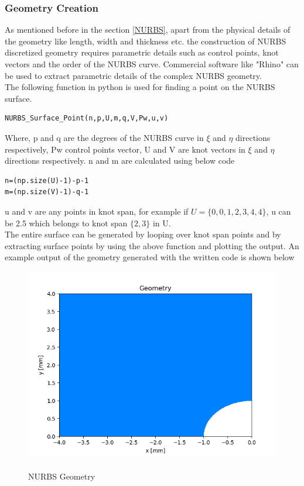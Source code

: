 \documentclass[11pt]{article}
\begin{document}
\subsubsection{Geometry Creation} \label{GeometryCreation}
As mentioned before in the section \ref{NURBS}, apart from the physical details of the geometry like length, width and thickness etc. the construction of NURBS discretized geometry requires parametric details such as control points, knot vectors and the order of the NURBS curve. Commercial software like "Rhino" can be used to extract parametric details of the complex NURBS geometry. \\ The following function in python is used for finding a point on the NURBS surface.
\begin{verbatim}
NURBS_Surface_Point(n,p,U,m,q,V,Pw,u,v)
\end{verbatim}
Where, p and q are the degrees of the NURBS curve in $\xi$ and $\eta$ directions respectively, Pw control points vector, U and V are knot vectors in $\xi$ and $\eta$ directions respectively. 
n and m are calculated using below code
\begin{verbatim}
n=(np.size(U)-1)-p-1
m=(np.size(V)-1)-q-1 
\end{verbatim}
u and v are any points in knot span, for example if 
$U = \{0,0,1,2,3,4,4\}$,
u can be 2.5 which belongs to knot span $\{2,3\}$ in U.\\
The entire surface can be generated by looping over knot span points and by extracting surface points by using the above function and plotting the output. 
An example output of the geometry generated with the written code is shown below
\begin{figure}[H]
	\begin{center}
		\includegraphics[scale=0.6]{Geometry.png} 
		\caption{\\NURBS Geometry}\label{Geometry}
	\end{center}	
\end{figure}
\end{document}
